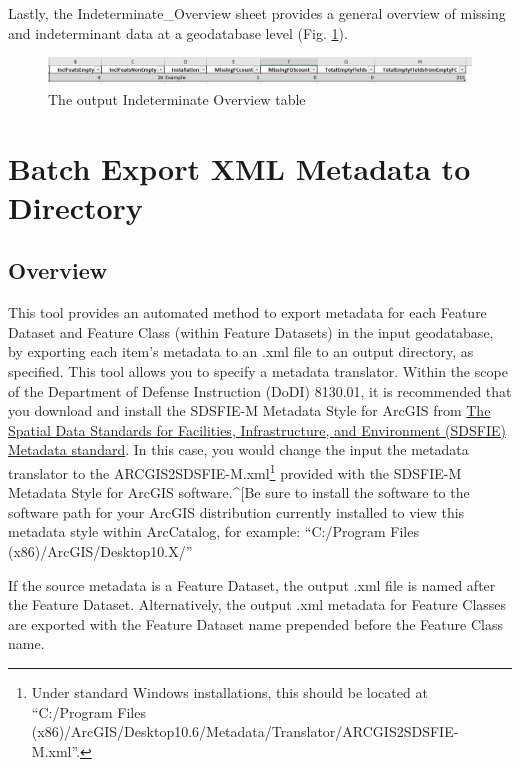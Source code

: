 \documentclass[openany]{book}
\let\rmarkdownfootnote\footnote%
\def\footnote{\protect\rmarkdownfootnote}
\theoremstyle{definition}
\theoremstyle{definition}
\theoremstyle{definition}
\theoremstyle{remark}
\begin{document}
Lastly, the Indeterminate\_Overview sheet provides a general overview of
missing and indeterminant data at a geodatabase level (Fig.
\ref{fig:summIndtsheet4}).

\begin{figure}[H]

{\centering \includegraphics[width=5.67in,]{figures/summIndt-sheet4} 

}

\caption{The output Indeterminate Overview table}\label{fig:summIndtsheet4}
\end{figure}

\hypertarget{exMeta}{\chapter{Batch Export XML Metadata to
Directory}\label{exMeta}}

\section{Overview}\label{overview-11}

This tool provides an automated method to export metadata for each
Feature Dataset and Feature Class (within Feature Datasets) in the input
geodatabase, by exporting each item's metadata to an .xml file to an
output directory, as specified. This tool allows you to specify a
metadata translator. Within the scope of the Department of Defense
Instruction (DoDI) 8130.01, it is recommended that you download and
install the SDSFIE-M Metadata Style for ArcGIS from
\href{https://www.sdsfieonline.org/Standards/Metadata}{The Spatial Data
Standards for Facilities, Infrastructure, and Environment (SDSFIE)
Metadata standard}. In this case, you would change the input the
metadata translator to the ARCGIS2SDSFIE-M.xml\footnote{Under standard
  Windows installations, this should be located at ``C:/Program Files
  (x86)/ArcGIS/Desktop10.6/Metadata/Translator/ARCGIS2SDSFIE-M.xml''.}
provided with the SDSFIE-M Metadata Style for ArcGIS software.\^{}{[}Be
sure to install the software to the software path for your ArcGIS
distribution currently installed to view this metadata style within
ArcCatalog, for example: ``C:/Program Files (x86)/ArcGIS/Desktop10.X/''

If the source metadata is a Feature Dataset, the output .xml file is
named after the Feature Dataset. Alternatively, the output .xml metadata
for Feature Classes are exported with the Feature Dataset name prepended
before the Feature Class name.
\end{document}
